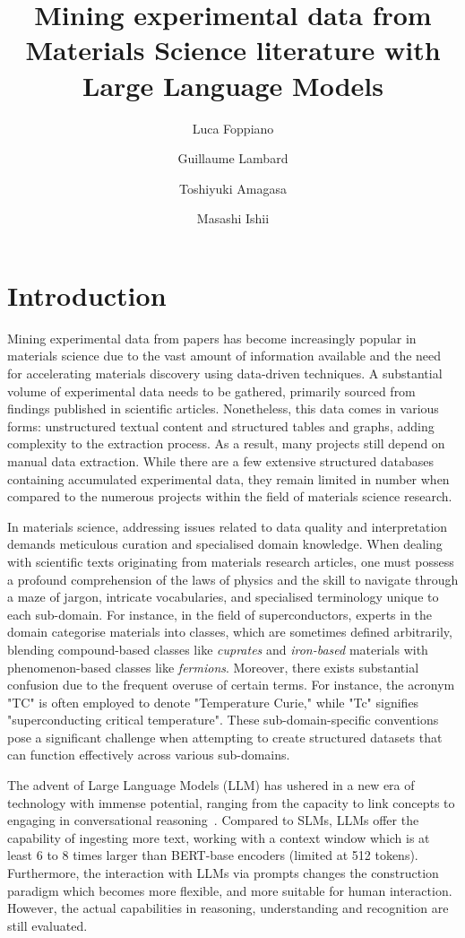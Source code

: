 \documentclass[a4paper]{article}
\title{Mining experimental data from Materials Science literature with Large Language Models}
\author[1,2]{Luca Foppiano}
\author[1]{Guillaume Lambard}
\author[2]{Toshiyuki Amagasa}
\author[1]{Masashi Ishii}
\affil[1]{Data-driven Materials Research Field, Centre for Basic Research on Materials, NIMS, JP}
\affil[2]{Knowledge and Data Engineering, Centre for Computational Sciences, University of Tsukuba}
\begin{document}
\maketitle

\section{Introduction}

Mining experimental data from papers has become increasingly popular in materials science due to the vast amount of information available and the need for accelerating materials discovery using data-driven techniques.
A substantial volume of experimental data needs to be gathered, primarily sourced from findings published in scientific articles.
Nonetheless, this data comes in various forms: unstructured textual content and structured tables and graphs, adding complexity to the extraction process. 
As a result, many projects still depend on manual data extraction.
While there are a few extensive structured databases containing accumulated experimental data, they remain limited in number when compared to the numerous projects within the field of materials science research.

In materials science, addressing issues related to data quality and interpretation demands meticulous curation and specialised domain knowledge.
When dealing with scientific texts originating from materials research articles, one must possess a profound comprehension of the laws of physics and the skill to navigate through a maze of jargon, intricate vocabularies, and specialised terminology unique to each sub-domain. 
For instance, in the field of superconductors, experts in the domain categorise materials into classes, which are sometimes defined arbitrarily, blending compound-based classes like \textit{cuprates} and \textit{iron-based} materials with phenomenon-based classes like \textit{fermions}. 
Moreover, there exists substantial confusion due to the frequent overuse of certain terms. For instance, the acronym "TC" is often employed to denote "Temperature Curie," while "Tc" signifies "superconducting critical temperature". 
These sub-domain-specific conventions pose a significant challenge when attempting to create structured datasets that can function effectively across various sub-domains.

The advent of Large Language Models (LLM) has ushered in a new era of technology with immense potential, ranging from the capacity to link concepts to engaging in conversational reasoning~\cite{zhang2023one,yao2023tree,valmeekam2023planning,sun2023pearl}.
Compared to SLMs, LLMs offer the capability of ingesting more text, working with a context window which is at least 6 to 8 times larger than BERT-base encoders (limited at 512 tokens). 
Furthermore, the interaction with LLMs via prompts changes the construction paradigm which becomes more flexible, and more suitable for human interaction. 
However, the actual capabilities in reasoning, understanding and recognition are still evaluated.
\end{document}
